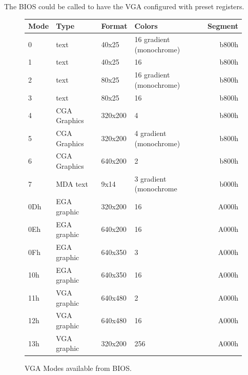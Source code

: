 \documentclass[book.tex]{subfiles}
\begin{document}
The BIOS could be called to have the VGA configured with preset registers.

\begin{figure}[H]
\centering
\begin{table}[H]
\begin{tabular}[c]{llllr}
\hline
\textbf{Mode} & \textbf{Type} & \textbf{Format} & \textbf{Colors}          & \multicolumn{1}{l}{\textbf{Segment}} \\ \hline
0             & text          & 40x25           & 16 gradient (monochrome) & b800h                                \\ \hline
1             & text          & 40x25           & 16                       & b800h                                \\ \hline
2             & text          & 80x25           & 16 gradient (monochrome) & b800h                                \\ \hline
3             & text          & 80x25           & 16                       & b800h                                \\ \hline
4             & CGA Graphics  & 320x200         & 4                        & b800h                                \\ \hline
5             & CGA Graphics  & 320x200         & 4 gradient (monochrome)  & b800h                                \\ \hline
6             & CGA Graphics  & 640x200         & 2                        & b800h                                \\ \hline
7             & MDA text      & 9x14            & 3 gradient (monochrome   & b000h                                \\ \hline
0Dh           & EGA graphic   & 320x200         & 16                       & A000h                                \\ \hline
0Eh           & EGA graphic   & 640x200         & 16                       & A000h                                \\ \hline
0Fh           & EGA graphic   & 640x350         & 3                        & A000h                                \\ \hline
10h           & EGA graphic   & 640x350         & 16                       & A000h                                \\ \hline
11h           & VGA graphic   & 640x480         & 2                        & A000h                                \\ \hline
12h           & VGA graphic   & 640x480         & 16                       & A000h                                \\ \hline
13h           & VGA graphic   & 320x200         & 256                      & A000h                                \\ \hline
\end{tabular}
\end{table}
\caption{VGA Modes available from BIOS.}\label{fig:vga_modes}
 \end{figure}
 
\end{document}
